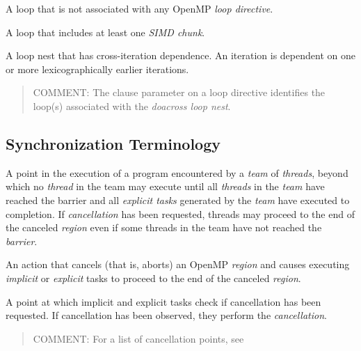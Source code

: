 \glossarydefstart
A loop that is not associated with any OpenMP \emph{loop directive}.
\glossarydefend

\glossarydefstart
A loop that includes at least one \emph{SIMD chunk}.
\glossarydefend

\glossarydefstart
A loop nest that has cross-iteration dependence. An iteration is dependent on one or more lexicographically earlier iterations.
\begin{quote}
COMMENT: The  clause parameter on a loop directive identifies the loop(s) associated with the \emph{doacross loop nest}.
\end{quote}
\glossarydefend

%
%
\subsection{Synchronization Terminology}
\label{subsec:Synchronization Terminology}
\glossarydefstart
A point in the execution of a program encountered by a \emph{team} of \emph{threads}, beyond 
which no \emph{thread} in the team may execute until all \emph{threads} in the \emph{team} have 
reached the barrier and all \emph{explicit tasks} generated by the \emph{team} have executed to 
completion. If \emph{cancellation} has been requested, threads may proceed to the end of 
the canceled \emph{region} even if some threads in the team have not reached the \emph{barrier}.
\glossarydefend

\glossarydefstart
An action that cancels (that is, aborts) an OpenMP \emph{region} and causes executing 
\emph{implicit} or \emph{explicit} tasks to proceed to the end of the canceled \emph{region}. 
\glossarydefend

\glossarydefstart
A point at which implicit and explicit tasks check if cancellation has been 
requested. If cancellation has been observed, they perform the \emph{cancellation}. 

\begin{quote}
COMMENT: For a list of cancellation points, see 
\end{quote}
\glossarydefend
\bigskip







